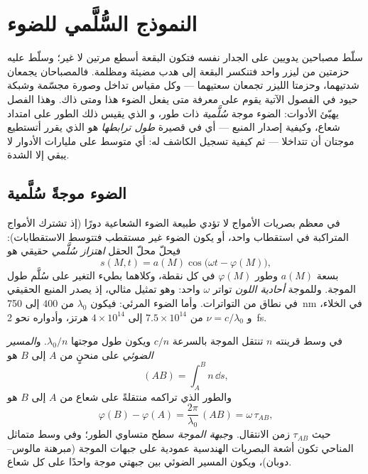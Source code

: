 \chapter{النموذج السُّلَّمي للضوء}\label{ch:b2:scalar-light-model}

سلّط مصباحين يدويين على الجدار نفسه فتكون البقعة أسطع مرتين
لا غير؛ وسلّط عليه حزمتين من ليزر واحد فتنكسر البقعة إلى
هدب مضيئة ومظلمة. فالمصباحان يجمعان شدتيهما، وحزمتا الليزر
تجمعان سعتيهما --- وكل مقياس تداخل وصورة مجسّمة
وشبكة حيود في الفصول الآتية يقوم على معرفة متى يفعل الضوء
هذا ومتى ذاك. وهذا الفصل يهيّئ الأدوات: الضوء موجة \emph{سُلَّمية}
ذات طور، و\emph{} الذي يقيس ذلك الطور
على امتداد شعاع، وكيفية إصدار المنبع --- أي في  قصيرة
\emph{طول ترابطها} هو الذي يقرر أتستطيع موجتان أن تتداخلا --- ثم
كيفية تسجيل الكاشف له: أي متوسط على مليارات الأدوار
لا يبقي إلا الشدة.

\section{الضوء موجةً سُلَّمية}

\begin{definition}\label{def:b2:scalar-light-model:scalar}
في معظم بصريات الأمواج لا تؤدي طبيعة الضوء الشعاعية دورًا (إذ
تشترك الأمواج المتراكبة في استقطاب واحد، أو يكون الضوء غير مستقطب
فتتوسط الاستقطابات): فيحلّ محلّ الحقل \emph{اهتزاز سُلَّمي}
حقيقي هو
\[
s(M, t) = a(M)\cos\bigl(\omega t - \varphi(M)\bigr) ,
\]
بسعة $a(M)$ وطور $\varphi(M)$ في كل نقطة، وكلاهما
بطيء التغير على سُلَّم طول الموجة. وللموجة \emph{أحادية اللون}
تواتر $\omega$ واحد: وهو تمثيل مثالي، إذ يصدر المنبع الحقيقي
في نطاق من التواترات. وأما الضوء المرئي: فيكون $\lambda_0$ من $400$ إلى
\qty{750}{nm} في الخلاء، و $\nu = c/\lambda_0$ من $7.5 \times 10^{14}$ إلى $4 \times 10^{14}$ هرتز،
وأدواره نحو \qty{2}{fs}.
\end{definition}

\begin{definition}\label{def:b2:scalar-light-model:path}
في وسط قرينته $n$ تنتقل الموجة بالسرعة $c/n$ ويكون طول موجتها
$\lambda_0/n$. و\emph{المسير الضوئي} على منحنٍ من $A$ إلى $B$ هو
\[
(AB) = \int_A^Bn\,\dd s ,
\]
والطور الذي تراكمه  منتقلةً على
شعاع من $A$ إلى $B$ هو
\[
\varphi(B) - \varphi(A) = \frac{2\pi}{\lambda_0}\,(AB) = \omega\,\tau_{AB} ,
\]
حيث $\tau_{AB}$ زمن الانتقال. و\emph{جبهة الموجة} سطح
متساوي الطور؛ وفي وسط متماثل المناحي تكون أشعة البصريات الهندسية
عمودية على جبهات الموجة (مبرهنة مالوس--دوبان)، ويكون المسير
الضوئي بين جبهتي موجة واحدًا على كل شعاع.
\end{definition}

